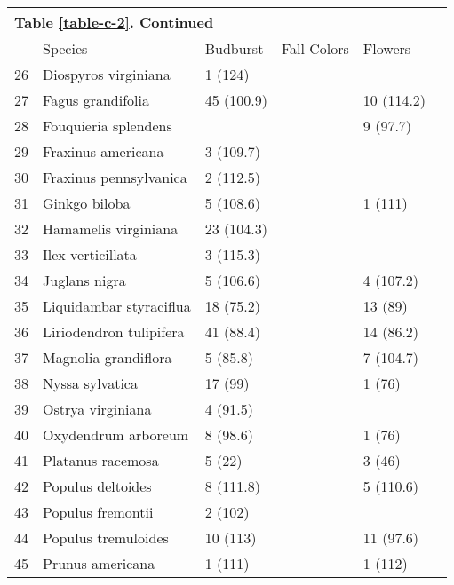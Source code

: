 
\begin{table}
\begin{tabularx}{\textwidth}{p{0.5cm}XXXXX}
\multicolumn{3}{l}{Table \ref{table-c-2}. Continued}\\
\hline
& Species & Budburst & Fall Colors & Flowers\\
\hline

26 & Diospyros virginiana & 1 (124) &  &  \\ 
27 & Fagus grandifolia & 45 (100.9) &  & 10 (114.2) \\ 
28 & Fouquieria splendens &  &  & 9 (97.7) \\ 
29 & Fraxinus americana & 3 (109.7) &  &  \\ 
30 & Fraxinus pennsylvanica & 2 (112.5) &  &  \\ 
31 & Ginkgo biloba & 5 (108.6) &  & 1 (111) \\ 
32 & Hamamelis virginiana & 23 (104.3) &  &  \\ 
33 & Ilex verticillata & 3 (115.3) &  &  \\ 
34 & Juglans nigra & 5 (106.6) &  & 4 (107.2) \\ 
35 & Liquidambar styraciflua & 18 (75.2) &  & 13 (89) \\ 
36 & Liriodendron tulipifera & 41 (88.4) &  & 14 (86.2) \\ 
37 & Magnolia grandiflora & 5 (85.8) &  & 7 (104.7) \\ 
38 & Nyssa sylvatica & 17 (99) &  & 1 (76) \\ 
39 & Ostrya virginiana & 4 (91.5) &  &  \\ 
40 & Oxydendrum arboreum & 8 (98.6) &  & 1 (76) \\ 
41 & Platanus racemosa & 5 (22) &  & 3 (46) \\ 
42 & Populus deltoides & 8 (111.8) &  & 5 (110.6) \\ 
43 & Populus fremontii & 2 (102) &  &  \\ 
44 & Populus tremuloides & 10 (113) &  & 11 (97.6) \\ 
45 & Prunus americana & 1 (111) &  & 1 (112) \\ 

\hline
\end{tabularx}
\end{table}



